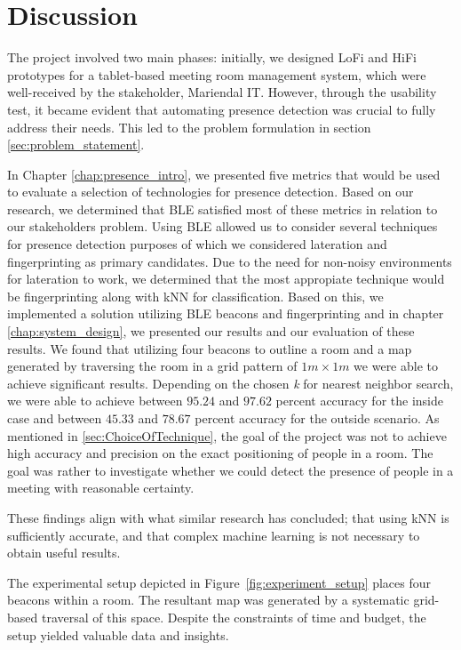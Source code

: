 \chapter{Discussion}\label{chap:discussion}
The project involved two main phases: initially, we designed LoFi and HiFi prototypes for a tablet-based meeting room management system, which were well-received by the stakeholder, Mariendal IT.
However, through the usability test, it became evident that automating presence detection was crucial to fully address their needs.
This led to the problem formulation in section \ref{sec:problem_statement}.

In Chapter \ref{chap:presence_intro}, we presented five metrics that would be used to evaluate a selection of technologies for presence detection.
Based on our research, we determined that BLE satisfied most of these metrics in relation to our stakeholders problem.
Using BLE allowed us to consider several techniques for presence detection purposes of which we considered lateration and fingerprinting as primary candidates.
Due to the need for non-noisy environments for lateration to work, we determined that the most appropiate technique would be fingerprinting along with kNN for classification.
Based on this, we implemented a solution utilizing BLE beacons and fingerprinting and in chapter \ref{chap:system_design}, we presented our results and our evaluation of these results. 
We found that utilizing four beacons to outline a room and a map generated by traversing the room in a grid pattern of $1m \times 1m$ we were able to achieve significant results.
Depending on the chosen \textit{k} for nearest neighbor search, we were able to achieve between $95.24$ and $97.62$ percent accuracy for the inside case and between $45.33$ and $78.67$ percent accuracy for the outside scenario. 
As mentioned in \ref{sec:ChoiceOfTechnique}, the goal of the project was not to achieve high accuracy and precision on the exact positioning of people in a room. 
The goal was rather to investigate whether we could detect the presence of people in a meeting with reasonable certainty.

These findings align with what similar research has concluded; that using kNN is sufficiently accurate, and that complex machine learning is not necessary to obtain useful results.\cite{ble_kneares_neural}

The experimental setup depicted in Figure~\ref{fig:experiment_setup} places four beacons within a room.
The resultant map was generated by a systematic grid-based traversal of this space.
Despite the constraints of time and budget, the setup yielded valuable data and insights.

